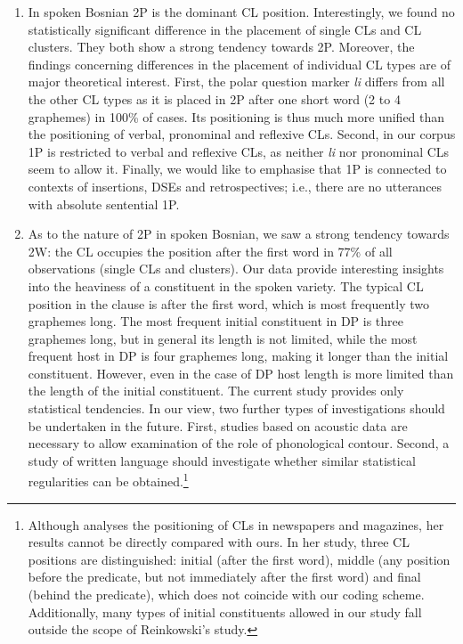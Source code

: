 \begin{enumerate}[label=A\arabic*:]
\item In spoken Bosnian 2P is the dominant CL position. Interestingly, we found no statistically significant difference in the placement of single CLs and CL clusters. They both show a strong tendency towards 2P. Moreover, the findings concerning differences in the placement of individual CL types are of major theoretical interest. First, the polar question marker \textit{li} differs from all the other CL types as it is placed in 2P after one short word (2 to 4 graphemes) in 100\% of cases. Its positioning is thus much more unified than the positioning of verbal, pronominal and reflexive CLs. Second, in our corpus 1P is restricted to verbal and reflexive CLs, as neither \textit{li} nor pronominal CLs seem to allow it. Finally, we would like to emphasise that 1P is connected to contexts of insertions, DSEs and retrospectives; i.e., there are no utterances with absolute sentential 1P.

\item As to the nature of 2P in spoken Bosnian, we saw a strong tendency towards 2W: the CL occupies the position after the first word in 77\% of all observations (single CLs and clusters). Our data provide interesting insights into the heaviness of a constituent in the spoken variety. The typical CL position in the clause is after the first word, which is most frequently two graphemes long. The most frequent initial constituent in DP is three graphemes long, but in general its length is not limited, while the most frequent host in DP is four graphemes long, making it longer than the initial constituent. However, even in the case of DP host length is more limited than the length of the initial constituent. The current study provides only statistical tendencies. In our view, two further types of investigations should be undertaken in the future. First, studies based on acoustic data are necessary to allow examination of the role of phonological contour. Second, a study of written language should investigate whether similar statistical regularities can be obtained.\footnote{Although \citet{Reinkowski01} analyses the positioning of CLs in newspapers and magazines, her results cannot be directly compared with ours. In her study, three CL positions are distinguished: initial (after the first word), middle (any position before the predicate, but not immediately after the first word) and final (behind the predicate), which does not coincide with our coding scheme. Additionally, many types of initial constituents allowed in our study fall outside the scope of Reinkowski’s study.}


\end{enumerate}
